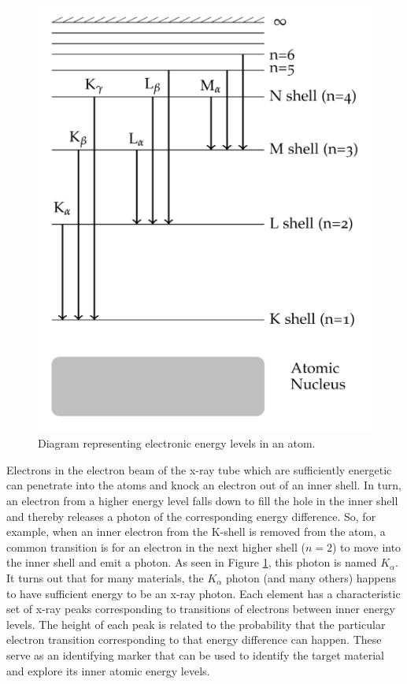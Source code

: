 \documentclass[12pt, a4paper, oneside, openright, titlepage]{book}
\begin{document}
\begin{figure}[H]
    \centering
    \includegraphics[scale = 0.8]{Images/XR5.PNG}
    \caption{Diagram representing electronic energy levels in an atom.}
    \label{fig:XR5}
\end{figure}

\noindent Electrons in the electron beam of the x-ray tube which are sufficiently energetic can penetrate into the atoms and knock an electron out of an inner shell. In turn, an electron from a higher energy level falls down to fill the hole in the inner shell and thereby releases a photon of the corresponding energy difference. So, for example, when an inner electron from the K-shell is removed from the atom, a common transition is for an electron in the next higher shell ($n = 2$) to move into the inner shell and emit a photon. As seen in Figure \ref{fig:XR5}, this photon is named $K_{\alpha}$. It turns out that for many materials, the $K_{\alpha}$ photon (and many others) happens to have sufficient energy to be an x-ray photon. Each element has a characteristic set of x-ray peaks corresponding to transitions of electrons between inner energy levels. The height of each peak is related to the probability that the particular electron transition corresponding to that energy difference can happen. These  serve as an identifying marker that can be used to identify the target material and explore its inner atomic energy levels.
\end{document}
